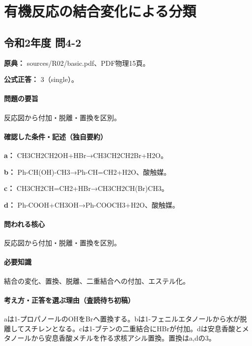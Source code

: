 \section{有機反応の結合変化による分類}

\subsection{令和2年度 問4-2}
\label{q:r02-reg-basic-4-2}

\noindent\textbf{原典：} sources/R02/basic.pdf、PDF物理15頁。

\textbf{公式正答：} 3（single）。

\paragraph{問題の要旨} 反応図から付加・脱離・置換を区別。

\paragraph{確認した条件・記述（独自要約）}\mbox{}\par

\noindent\textbf{a：} CH3CH2CH2OH+HBr→CH3CH2CH2Br+H2O。\par

\noindent\textbf{b：} Ph-CH(OH)-CH3→Ph-CH=\allowbreak{}CH2+H2O、酸触媒。\par

\noindent\textbf{c：} CH3CH2CH=\allowbreak{}CH2+HBr→CH3CH2CH(Br)CH3。\par

\noindent\textbf{d：} Ph-COOH+CH3OH→Ph-COOCH3+H2O、酸触媒。\par

\paragraph{問われる核心} 反応図から付加・脱離・置換を区別。

\paragraph{必要知識} 結合の変化、置換、脱離、二重結合への付加、エステル化。

\paragraph{考え方・正答を選ぶ理由（査読待ち初稿）} aは1-プロパノールのOHをBrへ置換する。bは1-フェニルエタノールから水が脱離してスチレンとなる。cは1-ブテンの二重結合にHBrが付加。dは安息香酸とメタノールから安息香酸メチルを作る求核アシル置換。置換はa,dの3。

